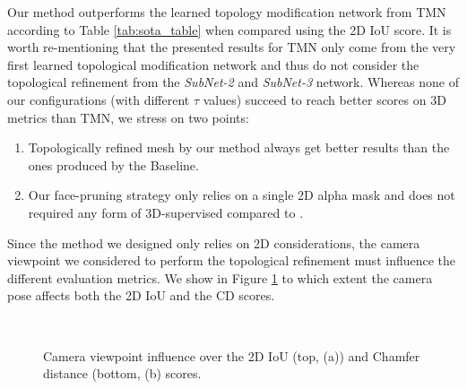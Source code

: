 Our method outperforms the learned topology modification network from TMN\citep{pan2019deep} according to Table \ref{tab:sota_table} when compared using the 2D IoU score. It is worth re-mentioning that the presented results for TMN\citep{pan2019deep} only come from the very first learned topological modification network and thus do not consider the topological refinement from the \textit{SubNet-2} and \textit{SubNet-3} network. Whereas none of our configurations (with different $\tau$ values) succeed to reach better scores on 3D metrics than TMN\citep{pan2019deep}, we stress on two points: \begin{enumerate}
    \item Topologically refined mesh by our method always get better results than the ones produced by the Baseline. 
    \item Our face-pruning strategy only relies on a single 2D alpha mask and does not required any form of 3D-supervised compared to \citep{pan2019deep}. 
\end{enumerate}

Since the method we designed only relies on 2D considerations, the camera viewpoint we considered to perform the topological refinement must influence the different evaluation metrics. We show in Figure \ref{fig:pruning_viewpoint_influence} to which extent the camera pose affects both the 2D IoU and the CD scores.


\begin{figure}[h!]
  \centering
   \\
  \caption{Camera viewpoint influence over the 2D IoU (top, (a)) and Chamfer distance (bottom, (b) scores.} \label{fig:pruning_viewpoint_influence}
\end{figure}


